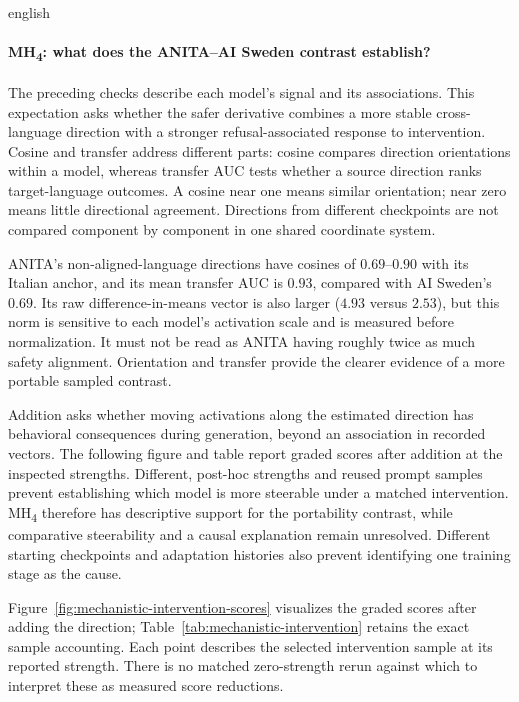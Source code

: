 \begin{otherlanguage*}{english}
\paragraph*{MH\textsubscript{4}: what does the ANITA--AI Sweden contrast establish?} The preceding checks describe each model's signal and its associations. This expectation asks whether the safer derivative combines a more stable cross-language direction with a stronger refusal-associated response to intervention. Cosine and transfer address different parts: cosine compares direction orientations within a model, whereas transfer AUC tests whether a source direction ranks target-language outcomes. A cosine near one means similar orientation; near zero means little directional agreement. Directions from different checkpoints are not compared component by component in one shared coordinate system.

ANITA's non-aligned-language directions have cosines of $0.69$--$0.90$ with its Italian anchor, and its mean transfer AUC is $0.93$, compared with AI Sweden's $0.69$. Its raw difference-in-means vector is also larger ($4.93$ versus $2.53$), but this norm is sensitive to each model's activation scale and is measured before normalization. It must not be read as ANITA having roughly twice as much safety alignment. Orientation and transfer provide the clearer evidence of a more portable sampled contrast.

Addition asks whether moving activations along the estimated direction has behavioral consequences during generation, beyond an association in recorded vectors. The following figure and table report graded scores after addition at the inspected strengths. Different, post-hoc strengths and reused prompt samples prevent establishing which model is more steerable under a matched intervention. MH\textsubscript{4} therefore has descriptive support for the portability contrast, while comparative steerability and a causal explanation remain unresolved. Different starting checkpoints and adaptation histories also prevent identifying one training stage as the cause.

\setcounter{secnumdepth}{3}

\clearpage
Figure~\ref{fig:mechanistic-intervention-scores} visualizes the graded scores after adding the direction; Table~\ref{tab:mechanistic-intervention} retains the exact sample accounting. Each point describes the selected intervention sample at its reported strength. There is no matched zero-strength rerun against which to interpret these as measured score reductions.


\end{otherlanguage*}
